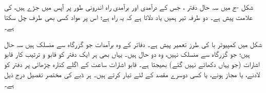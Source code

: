 شکل -ج  میں سہ حال دفتر ، جس کے درآمدی اور برآمدی  راہ  اندرونی طور پر   آپس میں جڑے ہیں، کی علامت  پیش ہے۔ دو طرفہ تیر ہمیں یاد دلاتا ہے کہ یہ راہ ہے؛  اس پر  مواد  کسی بھی  طرف  چل سکتا ہے۔

شکل   میں کمپیوٹر با کی طرز تعمیر پیش ہے۔   دفاتر کے وہ برآمدات جو  گزرگاہ  سے منسلک   ہیں سہ حال ہیں؛ جو  گزرگاہ سے منسلک نہیں، وہ دو حال ہیں۔ یہاں بھی ہر ایک دفتر کو  قابو و ترتیب کار قابو اشارات (جو یہاں دکھائے نہیں گئے)  بھیجتا ہے۔  قابو اشارات ساعت کے   اگلے کنارہ چڑھائی پر دفتر کو لادنے،  یا مجاز  ہونے، یا کسی دوسرے مقصد کے لئے تیار کرتے ہیں۔ ہر ڈبے کی مختصر تفصیل درج ذیل ہے۔

\begin{figure}
\centering
{}
\end{figure}
